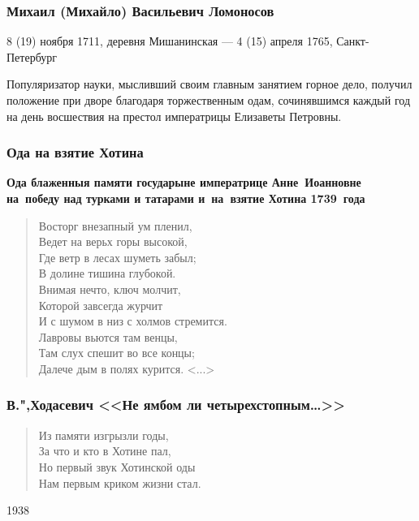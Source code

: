 \documentclass{beamer}
\begin{document}

\begin{frame}
\frametitle{Михаил (Михайло) Васильевич Ломоносов}

\begin{flushleft}
8 (19) ноября 1711, деревня Мишанинская — 4 (15) апреля 1765, Санкт-Петербург
\end{flushleft}

\begin{flushleft}
Популяризатор науки, мысливший своим главным занятием горное дело, получил положение при дворе благодаря торжественным одам, сочинявшимся каждый год на день восшествия на престол императрицы Елизаветы Петровны. 
\end{flushleft}

\end{frame}



\begin{frame}
\frametitle{Ода на взятие Хотина}
\begin{center}
\textbf{Ода блаженныя памяти государыне императрице Анне~Иоанновне на~победу над турками и татарами и~на~взятие Хотина 1739~года}
\end{center}

\begin{verse}
Восторг внезапный ум пленил,\\
Ведет на верьх горы высокой,\\
Где ветр в лесах шуметь забыл;\\
В долине тишина глубокой.\\
Внимая нечто, ключ молчит,\\
Которой завсегда журчит\\
И с шумом в низ с холмов стремится.\\
Лавровы вьются там венцы,\\
Там слух спешит во все концы;\\
Далече дым в полях курится. <...>
\end{verse}
\end{frame}


\begin{frame}
\frametitle{В.",Ходасевич <<Не ямбом ли четырехстопным\dots>>}

\begin{verse}
Из памяти изгрызли годы,\\
За что и кто в Хотине пал,\\
Но первый звук Хотинской оды\\
Нам первым криком жизни стал.
\end{verse}

1938
\end{frame}
\end{document}
